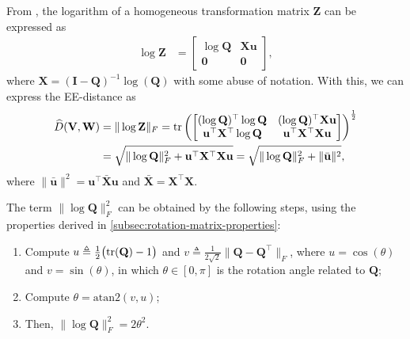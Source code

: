 From \citet[p. 41]{Gallier2020}, the logarithm of a homogeneous transformation matrix $\mathbf{Z}$ can be expressed as
\begin{align}
    \log\mathbf{Z} &= \begin{bmatrix}
        \log\mathbf{Q} & \mathbf{X}\mathbf{u}\\\mathbf{0} & \mathbf{0}
    \end{bmatrix},
\end{align}
where $\mathbf{X} = (\mathbf{I} - \mathbf{Q})^{-1}\log(\mathbf{Q})$ with some abuse of notation. With this, we can express the EE-distance as
\begin{align}
    \begin{split}
    \widehat{D}(\mathbf{V}, \mathbf{W}) &= \|\log\mathbf{Z}\|_F = \operatorname{tr}\left(
        \begin{bmatrix}
            (\log\mathbf{Q})^\top\log\mathbf{Q} & (\log\mathbf{Q})^\top\mathbf{X}\mathbf{u}\\
            \mathbf{u}^\top\mathbf{X}^\top\log\mathbf{Q} & \mathbf{u}^\top\mathbf{X}^\top\mathbf{X}\mathbf{u}
        \end{bmatrix}
    \right)^\frac{1}{2}\\
        &= \sqrt{\|\log\mathbf{Q}\|_F^2 + \mathbf{u}^\top\mathbf{X}^\top\mathbf{X}\mathbf{u}} = \sqrt{\|\log\mathbf{Q}\|_F^2 + \|\bar{\mathbf{u}}\|^2},
    \end{split}
\end{align}
where $\|\bar{\mathbf{u}}\|^2 = \mathbf{u}^\top\bar{\mathbf{X}}\mathbf{u}$ and $\bar{\mathbf{X}}=\mathbf{X}^\top\mathbf{X}$.

The term $\|\log\mathbf{Q}\|_F^2$ can be obtained by the following steps, using the properties derived in \cref{subsec:rotation-matrix-properties}:
\begin{enumerate}
    \item Compute $u \triangleq \frac{1}{2}\bigl(\operatorname{tr}(\mathbf{Q})-1\bigr)$ and $v \triangleq \frac{1}{2\sqrt{2}}\|\mathbf{Q}{-}\mathbf{Q}^{\top}\|_F$, where $u = \cos(\theta)$ and $v=\sin(\theta)$, in which $\theta \in [0, \pi]$ is the rotation angle related to $\mathbf{Q}$;
    \item Compute $\theta = \text{atan2}(v,u)$;
    \item Then, $\|\log\mathbf{Q}\|_F^2 = 2\theta^2$.
\end{enumerate}

